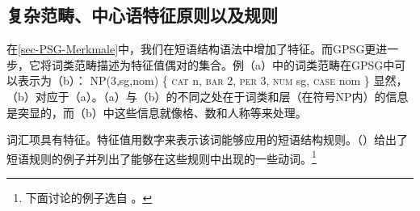 \subsection{复杂范畴、中心语特征原则以及\xbarc 规则}
\label{sec-complex-categories-gpsg}

在\ref{sec-PSG-Merkmale}中，我们在短语结构语法中增加了特征。而GPSG更进一步，它将词类范畴描述为特征值偶对的集合。例（a）中的词类范畴在GPSG中可以表示为（b）：
\eal
\ex NP(3,sg,{nom})
\ex \{ \textsc{cat} n, \textsc{bar} 2, \textsc{per} 3, \textsc{num} sg, \textsc{case} nom \} 
\zl
显然，（b）对应于（a）。（a）与（b）的不同之处在于词类和\xbarc 层（在符号NP内）的信息是突显的，而（b）中这些信息就像格、数和人称等来处理。

词汇项具有\subcatc 特征。特征值用数字来表示该词能够应用的短语结构规则。（）给出了短语规则的例子并列出了能够在这些规则中出现的一些动词。\footnote{%
下面讨论的例子选自 。
}

